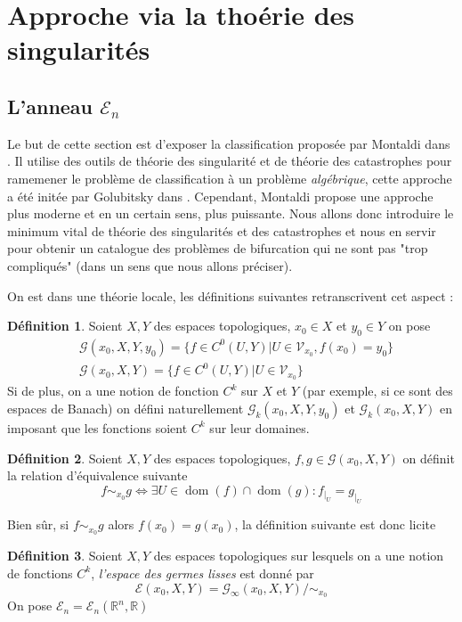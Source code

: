 \documentclass[a4paper,12pt,oneside,titlepage]{article}
\newcommand{\R}[0]{\mathbb{R}}
\theoremstyle{definition}
\newtheorem{definition}{Définition}[section]
\theoremstyle{plain}
\begin{document}
\section{Approche via la thoérie des singularités}
\subsection{L'anneau $\mathcal{E}_n$}
Le but de cette section est d'exposer la classification proposée par Montaldi dans \cite{montaldi2021sbc}. Il utilise des outils de théorie des singularité et de théorie des catastrophes pour ramemener le problème de classification à un problème \textit{algébrique}, cette approche a été initée par Golubitsky dans \cite{golubitsky1985sgb1}. Cependant, Montaldi propose une approche plus moderne et en un certain sens, plus puissante. Nous allons donc introduire le minimum vital de théorie des singularités et des catastrophes et nous en servir pour obtenir un catalogue des problèmes de bifurcation qui ne sont pas "trop compliqués" (dans un sens que nous allons préciser).

On est dans une théorie locale, les définitions suivantes retranscrivent cet aspect : 
\begin{definition}
    Soient $X,Y$ des espaces topologiques, $x_0\in X$ et $y_0\in Y$
    on pose 
    \begin{align*}
        &\mathcal{G}(x_0,X,Y,y_0)=\{ f\in C^0(U,Y) | U\in\mathcal{V}_{x_0},f(x_0)=y_0\} \\
        & \mathcal{G}(x_0,X,Y)=\{ f\in C^0(U,Y) | U\in\mathcal{V}_{x_0}\}
    \end{align*}
    Si de plus, on a une notion de fonction $C^k$ sur $X$ et $Y$ (par exemple, si ce sont des espaces de Banach) on défini naturellement $\mathcal{G}_k(x_0,X,Y,y_0)$ et $\mathcal{G}_k(x_0,X,Y)$ en imposant que les fonctions soient $C^k$ sur leur domaines.
\end{definition}

\begin{definition}
    Soient $X,Y$ des espaces topologiques, $f,g\in \mathcal{G}(x_0,X,Y)$ on définit la relation d'équivalence suivante
    \begin{equation*}
        f\sim_{x_0} g \Leftrightarrow \exists U\in \operatorname{dom}(f)
        \cap \operatorname{dom}(g) : f_{|_{U}}=g_{|_{U}}
    \end{equation*}

\end{definition}
 Bien sûr, si $f\sim_{x_0} g$ alors $f(x_0)=g(x_0)$, la définition suivante est donc licite
\begin{definition}
    Soient $X,Y$ des espaces topologiques sur lesquels on a une notion de fonctions $C^k$, \textit{l'espace des germes lisses} est donné par
    \begin{equation*}
        \mathcal{E}(x_0,X,Y)=\mathcal{G}_{\infty}(x_0,X,Y)/\sim_{x_0}
    \end{equation*}
    On pose  $\mathcal{E}_n=\mathcal{E}_n(\R^n,\R)$
\end{definition}
\end{document}
